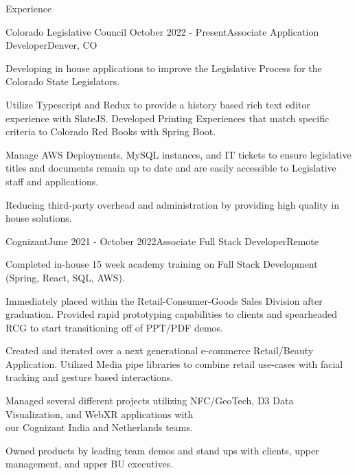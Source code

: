 \documentclass[
	11pt, %
]{resume} %
\begin{document}

\begin{rSection}{Experience}

	\begin{rSubsection}{Colorado Legislative Council }{October 2022 - Present}{Associate Application Developer}{Denver, CO}
		\item Developing in house applications to improve the Legislative Process for the Colorado State Legislators.
		\item Utilize Typescript and Redux to provide a history based rich text editor experience with SlateJS. Developed Printing Experiences that match specific criteria to Colorado Red Books with Spring Boot. 
		\item Manage AWS Deployments, MySQL instances, and IT tickets to ensure legislative titles and documents remain up to date and are easily accessible to Legislative staff and applications.
		\item Reducing third-party overhead and administration by providing high quality in house solutions.
	\end{rSubsection}


	\begin{rSubsection}{Cognizant}{June 2021 - October 2022}{Associate Full Stack Developer}{Remote}
		\item Completed in-house 15 week academy training on Full Stack Development (Spring, React, SQL, AWS).
		\item Immediately placed within the Retail-Consumer-Goods Sales Division after graduation. Provided rapid prototyping capabilities to clients and spearheaded RCG to start transitioning off of PPT/PDF demos.
		\item Created and iterated over a next generational e-commerce Retail/Beauty Application. Utilized Media pipe libraries to combine retail use-cases with facial tracking and gesture based interactions.
		\item Managed several different projects utilizing NFC/GeoTech, D3 Data Visualization, and WebXR applications with \\ our Cognizant India and Netherlands teams.
		\item Owned products by leading team demos and stand ups with clients, upper management, and upper BU executives.
	\end{rSubsection}

\end{rSection}
\end{document}
